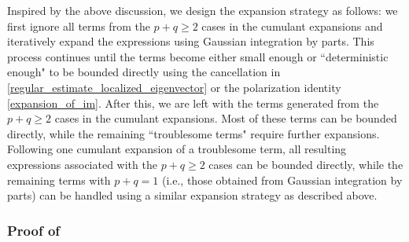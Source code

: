 \documentclass[10pt,reqno]{amsart}
\numberwithin{equation}{section}
\numberwithin{figure}{section}
\theoremstyle{plain} %
\theoremstyle{definition} %
\newcommand{\wt}{\widetilde}
\newcommand{\E}{\mathbb{E}}
\renewcommand{\geq}{\ge}
\newcommand{\avg}[1]{\langle #1 \rangle}
\newcommand{\tLambda}{{\wt{\Lambda}}}
\newcommand{\OO}{\mathrm{O}}
\newcommand{\tl}{\tLambda}
\numberwithin{equation}{section}
\begin{document}
Inspired by the above discussion, we design the expansion strategy as follows: we first ignore all terms from the $p+q\geq 2$ cases in the cumulant expansions and iteratively expand the expressions using Gaussian integration by parts. This process continues until the terms become either small enough or ``deterministic enough" to be bounded directly using the cancellation in \eqref{regular_estimate_localized_eigenvector} or the polarization identity \eqref{expansion_of_im}. 
After this, we are left with the terms generated from the $p+q\geq 2$ cases in the cumulant expansions. %
Most of these terms can be bounded directly, while the remaining ``troublesome terms" require further expansions. Following one cumulant expansion of a troublesome term, all resulting expressions associated with the $p+q\geq 2$ cases can be bounded directly, while the remaining terms with $p+q=1$ (i.e., those obtained from Gaussian integration by parts) can be handled using a similar expansion strategy as described above. 


\subsubsection{Proof of }
\end{document}
